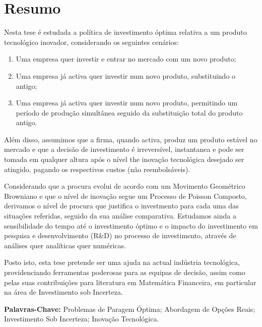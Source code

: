 
\section*{Resumo}



Nesta tese é estudada a política de investimento óptima relativa a um produto tecnológico inovador, considerando os seguintes cenários:
\begin{enumerate}
	\item Uma empresa quer investir e entrar no mercado com um novo produto;
	\item Uma empresa já activa quer investir num novo produto, substituindo o antigo; 
	\item Uma empresa já activa quer investir num novo produto, permitindo um período de produção simultânea seguido da substituição total do produto antigo.
\end{enumerate}

Além disso, assumimos que a firma, quando activa, produz um produto estável no mercado e que a decisão de investimento é irreversível, instantanea e pode ser tomada em qualquer altura após o nível the inovação tecnológica desejado ser atingido, pagando os respectivos custos (não reembolsáveis).

Considerando que a procura evolui de acordo com um Movimento Geométrico Browniano e que o nível de inovação segue um Processo de Poisson Composto, derivamos o nível de procura que justifica o investmento para cada uma das situações referidas, seguido da sua análise comparativa. Estudamos ainda a sensibilidade do tempo até o investimento óptimo e o impacto do investimento em pesquisa e desenvolvimento (R\&D) no processo de investimento, através de análises quer analíticas quer numéricas.

Posto isto, esta tese pretende ser uma ajuda na actual indústria tecnológica, providenciando ferramentas poderosas para as equipas de decisão, assim como pelas suas contribuições para literatura em Matemática Financeira, em particular na área de Investimento sob Incerteza.






\vfill

\textbf{\Large Palavras-Chave:} Problemas de Paragem Óptima; Abordagem de Opções Reais; Investimento Sob Incerteza; Inovação Tecnológica.
